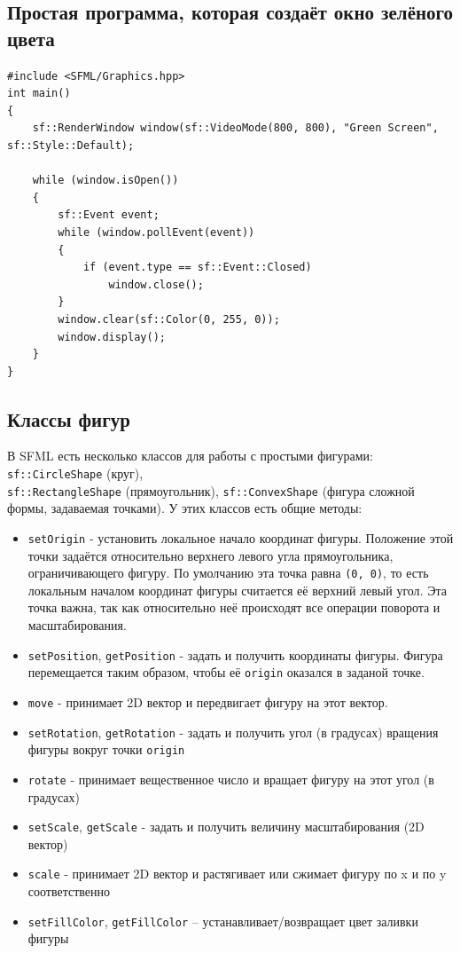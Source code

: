 \documentclass{article}
\begin{document}
\subsection*{Простая программа, которая создаёт окно зелёного цвета}
\begin{lstlisting}
#include <SFML/Graphics.hpp>
int main()
{
    sf::RenderWindow window(sf::VideoMode(800, 800), "Green Screen", sf::Style::Default);

    while (window.isOpen())
    {
        sf::Event event;
        while (window.pollEvent(event)) 
        {
            if (event.type == sf::Event::Closed)
                window.close();
        }
        window.clear(sf::Color(0, 255, 0));
        window.display();
    }
}
\end{lstlisting}

\subsection*{Классы фигур}
В SFML есть несколько классов для работы с простыми фигурами: \texttt{sf::CircleShape} (круг),\\ \texttt{sf::RectangleShape} (прямоугольник), \texttt{sf::ConvexShape} (фигура сложной формы, задаваемая точками). У этих классов есть общие методы:
\begin{itemize}
\item \texttt{setOrigin} - установить локальное начало координат фигуры. Положение этой точки задаётся относительно верхнего левого угла прямоугольника, ограничивающего фигуру. По умолчанию эта точка равна \texttt{(0, 0)}, то есть локальным началом координат фигуры считается её верхний левый угол.  Эта точка важна, так как относительно неё происходят все операции поворота и масштабирования.
\item \texttt{setPosition}, \texttt{getPosition} - задать и получить координаты фигуры. Фигура перемещается таким образом, чтобы её \texttt{origin} оказался в заданой точке.
\item \texttt{move} - принимает 2D вектор и передвигает фигуру на этот вектор.
\item \texttt{setRotation}, \texttt{getRotation} - задать и получить угол (в градусах) вращения фигуры вокруг точки \texttt{origin}
\item \texttt{rotate} - принимает вещественное число и вращает фигуру на этот угол (в градусах)
\item \texttt{setScale}, \texttt{getScale} - задать и получить величину масштабирования (2D вектор)
\item \texttt{scale} - принимает  2D вектор и растягивает или сжимает фигуру по x и по y соответственно
\item \texttt{setFillColor}, \texttt{getFillColor} -- устанавливает/возвращает цвет заливки фигуры
\end{itemize}
\end{document}
